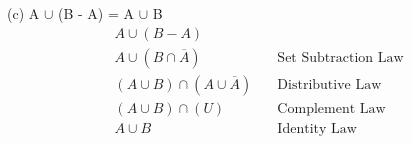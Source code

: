 \documentclass[12pt, letterpaper, twoside]{article}
\begin{document}
\break
(c) A $\cup$ (B - A) = A $\cup$ B\\
\begin{align*}
A \cup (B - A) &\\
A \cup (B \cap \overline{A}) & \quad \text{Set Subtraction Law}\\
(A \cup B) \cap (A \cup \overline{A}) & \quad \text{Distributive Law}\\
(A \cup B) \cap (U) & \quad \text{Complement Law}\\
A \cup B & \quad \text{Identity Law}\\
\end{align*}
\break
\end{document}
